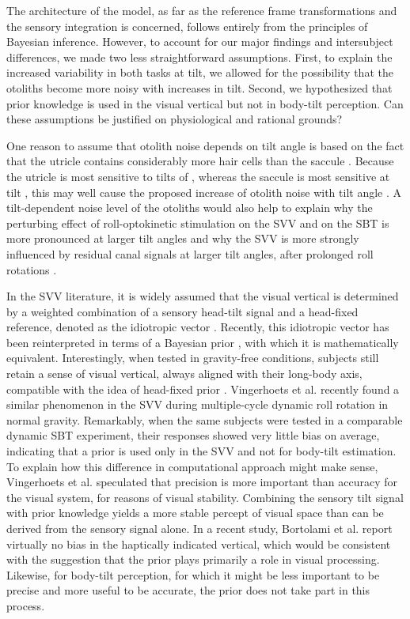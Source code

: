 The architecture of the model, as far as the reference frame transformations and the sensory integration is concerned, follows entirely from the principles of Bayesian inference. However, to account for our major findings and intersubject differences, we made two less straightforward assumptions. First, to explain the increased variability in both tasks at  tilt, we allowed for the possibility that the otoliths become more noisy with increases in tilt. Second, we hypothesized that prior knowledge is used in the visual vertical but not in body-tilt perception. Can these assumptions be justified on physiological and rational grounds? 

One reason to assume that otolith noise depends on tilt angle is based on the fact that the utricle contains considerably more hair cells than the saccule \cite{rosenhall1972, rosenhall1974}. Because the utricle is most sensitive to tilts of \textdegree, whereas the saccule is most sensitive at  tilt \cite{jaeger2008}, this may well cause the proposed increase of otolith noise with tilt angle \cite{tarnutzer2010}. A tilt-dependent noise level of the otoliths would also help to explain why the perturbing effect of roll-optokinetic stimulation on the SVV \cite{dichgans1974, fernandez1976} and on the SBT \cite{young1975} is more pronounced at larger tilt angles and why the SVV is more strongly influenced by residual canal signals at larger tilt angles, after prolonged roll rotations \cite{lorincz2008}.

In the SVV literature, it is widely assumed that the visual vertical is determined by a weighted combination of a sensory head-tilt signal and a head-fixed reference, denoted as the idiotropic vector \cite{mittelstaedt1983}. Recently, this idiotropic vector has been reinterpreted in terms of a Bayesian prior \cite{eggert1998, macneilage2007, devrijer2008}, with which it is mathematically equivalent. Interestingly, when tested in gravity-free conditions, subjects still retain a sense of visual vertical, always aligned with their long-body axis, compatible with the idea of head-fixed prior \cite{mittelstaedt1983}. Vingerhoets et al. \citeyear{vingerhoets2008} recently found a similar phenomenon in the SVV during multiple-cycle dynamic roll rotation in normal gravity. Remarkably, when the same subjects were tested in a comparable dynamic SBT experiment, their responses showed very little bias on average, indicating that a prior is used only in the SVV and not for body-tilt estimation. To explain how this difference in computational approach might make sense, Vingerhoets et al. \citeyear{vingerhoets2008} speculated that precision is more important than accuracy for the visual system, for reasons of visual stability. Combining the sensory tilt signal with prior knowledge yields a more stable percept of visual space than can be derived from the sensory signal alone. In a recent study, Bortolami et al. \citeyear{bortolami2006} report virtually no bias in the haptically indicated vertical, which would be consistent with the suggestion that the prior plays primarily a role in visual processing. Likewise, for body-tilt perception, for which it might be less important to be precise and more useful to be accurate, the prior does not take part in this process. 


